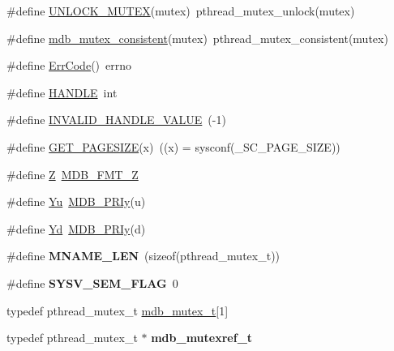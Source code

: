 \begin{DoxyCompactItemize}
\item 
\#define \mbox{\hyperlink{group__compat_ga67b430e471d24d8f4f2b35e2357c306b}{U\+N\+L\+O\+C\+K\+\_\+\+M\+U\+T\+EX}}(mutex)~pthread\+\_\+mutex\+\_\+unlock(mutex)
\item 
\#define \mbox{\hyperlink{group__compat_gaa7c1835176dba083697c5555571a8710}{mdb\+\_\+mutex\+\_\+consistent}}(mutex)~pthread\+\_\+mutex\+\_\+consistent(mutex)
\item 
\#define \mbox{\hyperlink{group__compat_ga18c1f579aab87bee11e1f4b3b9611fe0}{Err\+Code}}()~errno
\item 
\#define \mbox{\hyperlink{group__compat_gab521aa5010fb1afb801a899a55569e03}{H\+A\+N\+D\+LE}}~int
\item 
\#define \mbox{\hyperlink{group__compat_ga5fdc7facea201bfce4ad308105f88d0c}{I\+N\+V\+A\+L\+I\+D\+\_\+\+H\+A\+N\+D\+L\+E\+\_\+\+V\+A\+L\+UE}}~(-\/1)
\item 
\#define \mbox{\hyperlink{group__compat_ga948570910e2e84a556977f585cbfa2bf}{G\+E\+T\+\_\+\+P\+A\+G\+E\+S\+I\+ZE}}(x)~((x) = sysconf(\+\_\+\+S\+C\+\_\+\+P\+A\+G\+E\+\_\+\+S\+I\+ZE))
\item 
\#define \mbox{\hyperlink{group__compat_ga51591cf51bdd6c1f6015532422e7770e}{Z}}~\mbox{\hyperlink{lmdb_8h_a02f14b3b04c0dabb94e0742ca77882d1}{M\+D\+B\+\_\+\+F\+M\+T\+\_\+Z}}
\item 
\#define \mbox{\hyperlink{group__compat_ga5737f4364e61e615415bf5b4f01bf14d}{Yu}}~\mbox{\hyperlink{lmdb_8h_a11fe126f6ef1f04b1e2ea23c5a433865}{M\+D\+B\+\_\+\+P\+R\+Iy}}(u)
\item 
\#define \mbox{\hyperlink{group__compat_ga0d54d6c0d53bc97f2ee94dd254b9c127}{Yd}}~\mbox{\hyperlink{lmdb_8h_a11fe126f6ef1f04b1e2ea23c5a433865}{M\+D\+B\+\_\+\+P\+R\+Iy}}(d)
\item 
\mbox{\label{group__compat_gae6dd47a3744869e26d562134abc0e4c4}} 
\#define {\bfseries M\+N\+A\+M\+E\+\_\+\+L\+EN}~(sizeof(pthread\+\_\+mutex\+\_\+t))
\item 
\mbox{\label{group__compat_gadec7b2eaf27d00385bbbb9160b7224be}} 
\#define {\bfseries S\+Y\+S\+V\+\_\+\+S\+E\+M\+\_\+\+F\+L\+AG}~0
\end{DoxyCompactItemize}
\begin{DoxyCompactItemize}
\item 
typedef pthread\+\_\+mutex\+\_\+t \mbox{\hyperlink{group__compat_ga9b7b61d0ad68b601d11d93e5c1193391}{mdb\+\_\+mutex\+\_\+t}}\mbox{[}1\mbox{]}
\item 
\mbox{\label{group__compat_gafdea3c7cb34852138e447676e398f718}} 
typedef pthread\+\_\+mutex\+\_\+t $\ast$ {\bfseries mdb\+\_\+mutexref\+\_\+t}
\end{DoxyCompactItemize}


